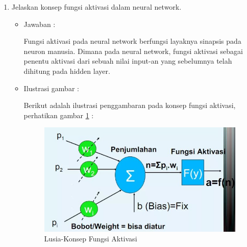 \begin{enumerate}
\item Jelaskan konsep fungsi aktivasi dalam neural network. 
	\begin{itemize}
	\item Jawaban :
		\par Fungsi aktivasi pada neural network berfungsi layaknya sinapsis pada neuron manusia. Dimana pada neural network, fungsi aktivasi sebagai penentu aktivasi dari sebuah nilai input-an yang sebelumnya telah dihitung pada hidden layer.
	\item Ilustrasi gambar :
		\par Berikut adalah ilustrasi penggambaran pada konsep fungsi aktivasi, perhatikan gambar \ref{6A4} :
		\begin{figure}[!hbtp]
		\centering
		\includegraphics[scale=0.5]{figures/s4.jpg}
		\caption{Lusia-Konsep Fungsi Aktivasi}
		\label{6A4}
		\end{figure}
	\end{itemize}
	

\end{enumerate}

